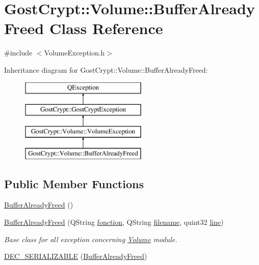 \hypertarget{class_gost_crypt_1_1_volume_1_1_buffer_already_freed}{}\section{Gost\+Crypt\+:\+:Volume\+:\+:Buffer\+Already\+Freed Class Reference}
\label{class_gost_crypt_1_1_volume_1_1_buffer_already_freed}


{\ttfamily \#include $<$Volume\+Exception.\+h$>$}

Inheritance diagram for Gost\+Crypt\+:\+:Volume\+:\+:Buffer\+Already\+Freed\+:\begin{figure}[H]
\begin{center}
\leavevmode
\includegraphics[height=4.000000cm]{class_gost_crypt_1_1_volume_1_1_buffer_already_freed}
\end{center}
\end{figure}
\subsection*{Public Member Functions}
\begin{DoxyCompactItemize}
\item 
\hyperlink{class_gost_crypt_1_1_volume_1_1_buffer_already_freed_a93bc005e1f5adddf75aa3d51445e478c}{Buffer\+Already\+Freed} ()
\item 
\hyperlink{class_gost_crypt_1_1_volume_1_1_buffer_already_freed_a90b7014ae993d27230c952b8cd65d3e8}{Buffer\+Already\+Freed} (Q\+String \hyperlink{class_gost_crypt_1_1_gost_crypt_exception_a29b8c93d5efbb1ff369107385725a939}{fonction}, Q\+String \hyperlink{class_gost_crypt_1_1_gost_crypt_exception_a749a12375f4ba9d502623b99d8252f38}{filename}, quint32 \hyperlink{class_gost_crypt_1_1_gost_crypt_exception_abf506d911f12a4e969eea500f90bd32c}{line})
\begin{DoxyCompactList}\small\item\em Base class for all exception concerning \hyperlink{class_gost_crypt_1_1_volume_1_1_volume}{Volume} module. \end{DoxyCompactList}\item 
\hyperlink{class_gost_crypt_1_1_volume_1_1_buffer_already_freed_a67a7917580c71fa8b36ea751db9904b9}{D\+E\+C\+\_\+\+S\+E\+R\+I\+A\+L\+I\+Z\+A\+B\+LE} (\hyperlink{class_gost_crypt_1_1_volume_1_1_buffer_already_freed}{Buffer\+Already\+Freed})
\end{DoxyCompactItemize}

